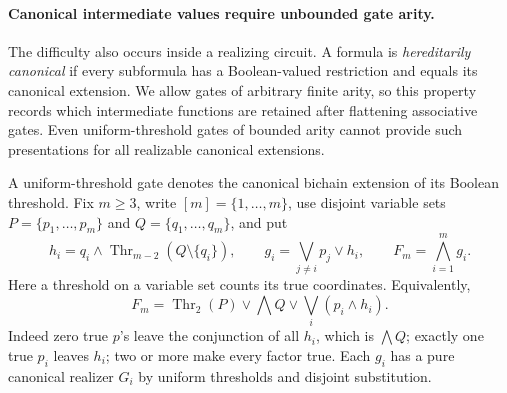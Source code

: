 \paragraph{Canonical intermediate values require unbounded gate arity.}
The difficulty also occurs inside a realizing circuit. A formula is
\emph{hereditarily canonical} if every subformula has a Boolean-valued
restriction and equals its canonical extension. We allow gates of arbitrary
finite arity, so this property records which intermediate functions are
retained after flattening associative gates. Even uniform-threshold gates
of bounded arity cannot provide such presentations for all realizable
canonical extensions.

A uniform-threshold gate denotes the canonical bichain extension of its
Boolean threshold. Fix $m\geq3$, write $[m]=\{1,\ldots,m\}$, use disjoint
variable sets $P=\{p_1,\ldots,p_m\}$ and $Q=\{q_1,\ldots,q_m\}$, and put
\[
 h_i=q_i\wedge\operatorname{Thr}_{m-2}(Q\setminus\{q_i\}),
 \qquad
 g_i=\bigvee_{j\ne i}p_j\vee h_i,
 \qquad F_m=\bigwedge_{i=1}^m g_i.
\]
Here a threshold on a variable set counts its true coordinates. Equivalently,
\[
 F_m=\operatorname{Thr}_2(P)\vee\bigwedge Q\vee\bigvee_i(p_i\wedge h_i).
\]
Indeed zero true $p$'s leave the conjunction of all $h_i$, which is
$\bigwedge Q$; exactly one true $p_i$ leaves $h_i$; two or more make
every factor true. Each $g_i$ has a pure canonical realizer $G_i$ by
uniform thresholds and disjoint substitution.

